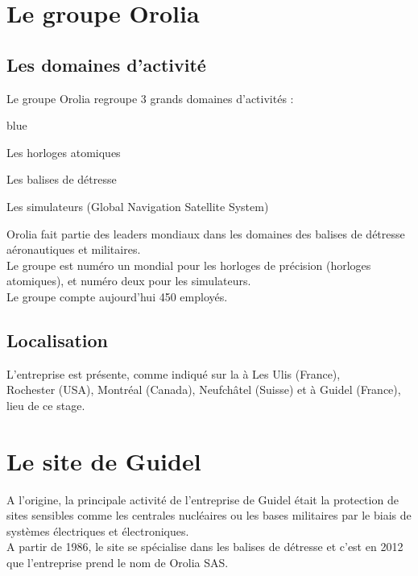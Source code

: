 \section{Le groupe Orolia}

\subsection{Les domaines d'activité}

Le groupe Orolia regroupe 3 grands domaines d'activités : 

\begin{items}{blue}{\Circle}
  \item Les horloges atomiques
  \item Les balises de détresse 
  \item Les simulateurs   (Global Navigation Satellite System)
\end{items}

Orolia fait partie des leaders mondiaux dans les domaines des balises de détresse aéronautiques et militaires.\\
Le groupe est numéro un mondial pour les horloges de précision (horloges atomiques), et numéro deux pour les simulateurs.\\

Le groupe compte aujourd’hui 450 employés.

\subsection{Localisation}

L'entreprise est présente, comme indiqué sur la  à Les Ulis (France),\\Rochester (USA), Montréal (Canada), Neufchâtel (Suisse) et à Guidel (France), lieu de ce stage.



\section{Le site de Guidel}

A l'origine, la principale activité de l’entreprise de Guidel était la protection de sites sensibles comme les centrales nucléaires ou les bases militaires par le biais de systèmes électriques et électroniques.\\
A partir de 1986, le site se spécialise dans les balises de détresse et c'est en 2012 que l'entreprise prend le nom de Orolia SAS.


